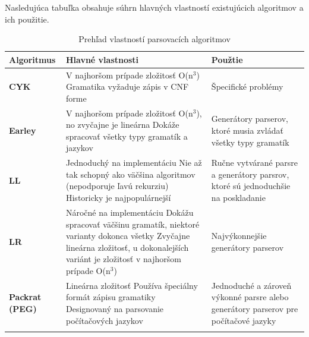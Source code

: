 Nasledujúca tabuľka obsahuje súhrn hlavných vlastností existujúcich algoritmov a ich použitie\cite{tomassetti:parsing}.

\begin{longtable}{|p{2.5cm}|p{6cm}|p{5.5cm}|}
\hline
\textbf{Algoritmus}    & \textbf{Hlavné vlastnosti}    						& \textbf{Použtie} \\ \hline
\textbf{CYK} \cite{CYK} & V najhoršom prípade zložitosť O(n$^3$)\newline 
						Gramatika vyžaduje zápis v CNF forme					& Špecifické problémy \\ \hline
                        
\textbf{Earley}
\cite{earley}		  & V najhoršom prípade zložitosť O(n$^3$), 
						no zvyčajne je lineárna\newline 
                        Dokáže spracovať všetky typy gramatík a jazykov		& Generátory parserov, ktoré musia 
                                                                              zvládať všetky typy gramatík  \\ \hline
                                                                              
  \textbf{LL} \cite{LL} & Jednoduchý na implementáciu \newline 
						 Nie až tak schopný ako väčšina algoritmov 
                         (nepodporuje ľavú rekurziu) \newline 
                         Historicky je najpopulárnejší						& Ručne vytvárané parsre a generátory 
                        													  parsrov, ktoré sú jednoduchšie na poskladanie  \\ \hline
                                                                              
\textbf{LR} \cite{LR}   & Náročné na implementáciu \newline 
						 Dokážu spracovať väčšinu gramatík, niektoré 
                         varianty dokonca všetky\newline 
                         Zvyčajne lineárna zložitosť, u dokonalejších 
                         variánt je zložitosť v najhoršom prípade O(n$^3$)		& Najvýkonnejšie generátory parserov \\ \hline
                         
\textbf{Packrat (PEG)}
\cite{Packrat}			& Lineárna zložitosť\newline 
						 Používa špeciálny formát zápisu gramatiky\newline 
                         Designovaný na parsovanie počítačových jazykov		& Jednoduché a zároveň výkonné parsre alebo 
                         													  generátory parserov pre počítačové jazyky \\ \hline         
\caption{Prehľad vlastností parsovacích algoritmov}
\label{my-label}
\end{longtable}

